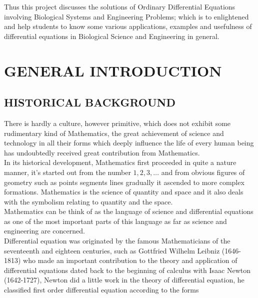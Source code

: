 \documentclass[11pt]{report}
\newcommand{\NI}{\noindent}
\begin{document}
	\NI Thus this project discusses the solutions of Ordinary Differential Equations involving Biological Systems and Engineering Problems; which is to enlightened and help students to know some various applications, examples and usefulness of differential equations in Biological Science and Engineering in general.\\ 
	
	\newpage
	\tableofcontents
	
	\newpage
	\chapter{GENERAL INTRODUCTION}
	\section{HISTORICAL BACKGROUND}
	There is hardly a culture, however primitive, which does not exhibit some rudimentary kind of Mathematics, the great achievement of science and technology in all their forms which deeply influence the life of every human being has undoubtedly received great contribution from Mathematics.\\
	
	\NI In its historical development, Mathematics first proceeded in quite a nature manner, it’s started out from the number $1, 2, 3,\ldots$ and from obvious figures of geometry such as points segments lines gradually it ascended to more complex formations. Mathematics is the science of quantity and space and it also deals with the symbolism relating to quantity and the space.\\
	
	\NI Mathematics can be think of as the language of science and differential equations as one of the most important parts of this language as far as science and engineering are concerned.\\
	
	\NI Differential equation was originated by the famous Mathematicians of the seventeenth and eighteen centuries, such as Gottfried Wilhelm Leibniz (1646-1813) who made an important contribution to the theory and application of differential equations dated back to the beginning of calculus with Isaac Newton (1642-1727), Newton did a little work in the theory of differential equation, he classified first order differential equation according to the forms
	
\end{document}
